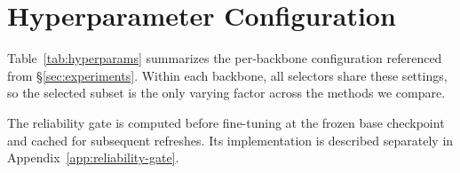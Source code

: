 
\section{Hyperparameter Configuration}
\label{app:hyperparams}

Table~\ref{tab:hyperparams} summarizes the per-backbone configuration
referenced from \S\ref{sec:experiments}. Within each backbone, all
selectors share these settings, so the selected subset is the only
varying factor across the methods we compare.

The reliability gate is computed before fine-tuning at the frozen base
checkpoint and cached for subsequent refreshes. Its implementation is
described separately in Appendix~\ref{app:reliability-gate}.

